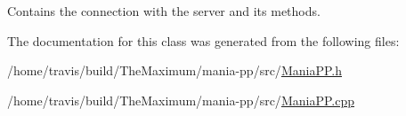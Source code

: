 Contains the connection with the server and its methods. 



The documentation for this class was generated from the following files\-:\begin{DoxyCompactItemize}
\item 
/home/travis/build/\-The\-Maximum/mania-\/pp/src/\hyperlink{ManiaPP_8h}{Mania\-P\-P.\-h}\item 
/home/travis/build/\-The\-Maximum/mania-\/pp/src/\hyperlink{ManiaPP_8cpp}{Mania\-P\-P.\-cpp}\end{DoxyCompactItemize}

